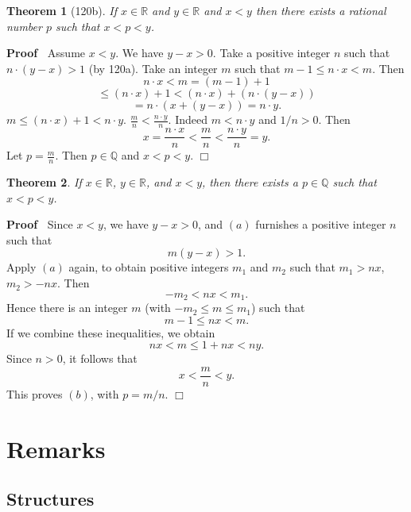 \documentclass{article}
\newenvironment{forthel}{\begin{leftbar}}{\end{leftbar}}
\newenvironment{proof}{\noindent\textbf{Proof\ }}{\hspace*{\fill}$\Box$\medskip}
\newtheorem{theorem}{Theorem}
\newcommand{\RR}{\mathbb{R}}
\newcommand{\QQ}{\mathbb{Q}}
\begin{document}
\begin{multicols}{2}

\begin{forthel}

\begin{theorem}[120b] If $x \in \RR$ and $y \in \RR$ and $x < y$ then there exists a rational number $p$ such that $x < p < y$. \end{theorem}
\begin{proof} 
Assume $x < y$.
We have $y - x > 0$.
Take a positive integer $n$ such that 
$n\cdot (y-x) > 1$ (by 120a).
Take an integer $m$ such that
$m -1 \leq n \cdot x < m$.
Then
$$n \cdot x < m = (m - 1) + 1 $$
$$\leq (n \cdot x) + 1 < (n \cdot x) + (n \cdot (y-x))$$
$$ = n \cdot (x + (y - x)) = n \cdot y.$$
$m \leq (n\cdot x) + 1 < n \cdot y$.
$\frac{m}{n} < \frac{n\cdot y}{n}$. Indeed $m < n\cdot y$ and $1/n > 0$.
Then
$$x = \frac{n\cdot x}{n} < \frac{m}{n} < \frac{n\cdot y}{n} = y.$$
Let $p = \frac{m}{n}$. Then $p \in \QQ$ and $x < p < y$.
\end{proof}

\end{forthel}

\columnbreak

\begin{theorem}
If $x\in\mathbb{R}$, $y\in\mathbb{R}$, and $x<y$, then there exists
a $p\in\mathbb{Q}$ such that $x<p<y$.
\end{theorem}
\begin{proof}
Since $x < y$, we have $y-x>0$, and $(a)$ furnishes a positive integer $n$ such that
$$m (y-x) > 1.$$
Apply $(a)$ again, to obtain positive integers $m_1$ and $m_2$ such that
$m_1 > n x$, $m_2 > -n x$. Then
$$-m_2 <n x < m_1.$$
Hence there is an integer $m$ (with $-m_2 \leq m \leq m_1$) such that
$$m-1 \leq n x < m.$$
If we combine these inequalities, we obtain
$$n x < m \leq 1 + n x < n y.$$
Since $n > 0$, it follows that
$$x < \frac{m}{n} < y.$$
This proves $(b)$, with $p = m/n$.
\end{proof}

\end{multicols}

\section{Remarks}
\subsection{Structures}
\end{document}
